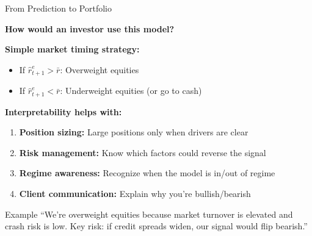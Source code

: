 \documentclass[10pt]{beamer}
\begin{document}
\begin{frame}{From Prediction to Portfolio}

  \textbf{How would an investor use this model?}

  \vspace{0.5em}
  \textbf{Simple market timing strategy:}
  \begin{itemize}
    \item If $\hat{r}_{t+1}^e > \bar{r}$: Overweight equities
    \item If $\hat{r}_{t+1}^e < \bar{r}$: Underweight equities (or go to cash)
  \end{itemize}

  \vspace{0.5em}
  \textbf{Interpretability helps with:}
  \begin{enumerate}
    \item \textbf{Position sizing:} Large positions only when drivers are clear
    \item \textbf{Risk management:} Know which factors could reverse the signal
    \item \textbf{Regime awareness:} Recognize when the model is in/out of regime
    \item \textbf{Client communication:} Explain why you're bullish/bearish
  \end{enumerate}

  \vspace{0.5em}
  \begin{block}{Example}
    ``We're overweight equities because market turnover is elevated and crash risk is low. Key risk: if credit spreads widen, our signal would flip bearish.''
  \end{block}
\end{frame}

\end{document}
